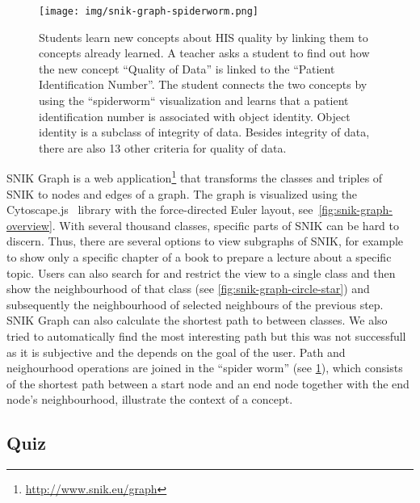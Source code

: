 \documentclass{IOS-Book-Article}     %
\newcommand{\citep}{\cite}%
\begin{document}
\begin{figure}
\caption{Students learn new concepts about HIS quality by linking them to concepts already learned.
A teacher asks a student to find out how the new concept \enquote{Quality of Data} is linked to the \enquote{Patient Identification Number}.
The student connects the two concepts by using the “spiderworm“ visualization and learns that a patient identification number is associated with object identity.
Object identity is a subclass of integrity of data.
Besides integrity of data, there are also 13 other criteria for quality of data.}
\label{fig:snik-graph-spiderworm}
\texttt{[image: img/snik-graph-spiderworm.png]}
\end{figure}
SNIK Graph is a web application\footnote{\url{http://www.snik.eu/graph}} that transforms the classes and triples of SNIK to nodes and edges of a graph.
The graph is visualized using the Cytoscape.js~\citep{cytoscape} library with the force-directed Euler layout, see~\cref{fig:snik-graph-overview}.
With several thousand classes, specific parts of SNIK can be hard to discern.
Thus, there are several options to view subgraphs of SNIK, for example to show only a specific chapter of a book to prepare a lecture about a specific topic.
Users can also search for and restrict the view to a single class and then show the neighbourhood of that class (see \cref{fig:snik-graph-circle-star}) and subsequently the neighbourhood of selected neighbours of the previous step.
SNIK Graph can also calculate the shortest path to between classes.
We also tried to automatically find the most interesting path but this was not successfull as it is subjective and the depends on the goal of the user.
Path and neighourhood operations are joined in the \enquote{spider worm} (see \cref{fig:snik-graph-spiderworm}), which consists of the shortest path between a start node and an end node together with the end node’s neighbourhood, illustrate the context of a concept.
\fi
\subsection{Quiz}
\end{document}
